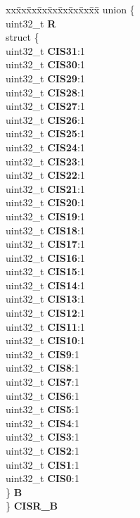 \begin{DoxyCompactItemize}
\begin{tabbing}
\end{tabbing}\item 
\mbox{\label{structETPU__tag_a85bd143ac7d77363068703fa5132b0ee}} 
\begin{tabbing}
xx\=xx\=xx\=xx\=xx\=xx\=xx\=xx\=xx\=\kill
union \{\\
\>uint32\_t {\bfseries R}\\
\>struct \{\\
\>\>uint32\_t {\bfseries CIS31}:1\\
\>\>uint32\_t {\bfseries CIS30}:1\\
\>\>uint32\_t {\bfseries CIS29}:1\\
\>\>uint32\_t {\bfseries CIS28}:1\\
\>\>uint32\_t {\bfseries CIS27}:1\\
\>\>uint32\_t {\bfseries CIS26}:1\\
\>\>uint32\_t {\bfseries CIS25}:1\\
\>\>uint32\_t {\bfseries CIS24}:1\\
\>\>uint32\_t {\bfseries CIS23}:1\\
\>\>uint32\_t {\bfseries CIS22}:1\\
\>\>uint32\_t {\bfseries CIS21}:1\\
\>\>uint32\_t {\bfseries CIS20}:1\\
\>\>uint32\_t {\bfseries CIS19}:1\\
\>\>uint32\_t {\bfseries CIS18}:1\\
\>\>uint32\_t {\bfseries CIS17}:1\\
\>\>uint32\_t {\bfseries CIS16}:1\\
\>\>uint32\_t {\bfseries CIS15}:1\\
\>\>uint32\_t {\bfseries CIS14}:1\\
\>\>uint32\_t {\bfseries CIS13}:1\\
\>\>uint32\_t {\bfseries CIS12}:1\\
\>\>uint32\_t {\bfseries CIS11}:1\\
\>\>uint32\_t {\bfseries CIS10}:1\\
\>\>uint32\_t {\bfseries CIS9}:1\\
\>\>uint32\_t {\bfseries CIS8}:1\\
\>\>uint32\_t {\bfseries CIS7}:1\\
\>\>uint32\_t {\bfseries CIS6}:1\\
\>\>uint32\_t {\bfseries CIS5}:1\\
\>\>uint32\_t {\bfseries CIS4}:1\\
\>\>uint32\_t {\bfseries CIS3}:1\\
\>\>uint32\_t {\bfseries CIS2}:1\\
\>\>uint32\_t {\bfseries CIS1}:1\\
\>\>uint32\_t {\bfseries CIS0}:1\\
\>\} {\bfseries B}\\
\} {\bfseries CISR\_B}\\


\end{tabbing}
\end{DoxyCompactItemize}

